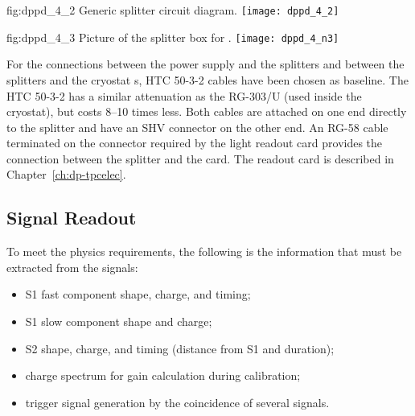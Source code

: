 \begin{dunefigure}{fig:dppd_4_2}
{Generic splitter circuit diagram.}
\texttt{[image: dppd\_4\_2]}
\end{dunefigure}

\begin{dunefigure}{fig:dppd_4_3}
{Picture of the splitter box for .}
\texttt{[image: dppd\_4\_n3]}
\end{dunefigure}

For the connections between the  power supply and the splitters and between the splitters and the cryostat \fdth{}s, HTC 50-3-2 cables have been chosen as baseline. The HTC 50-3-2 has a similar attenuation as the RG-303/U (used inside the cryostat), but costs \numrange{8}{10} times less. Both cables are attached on one end directly to the  splitter and have an SHV connector on the other end. An RG-58 cable terminated on the connector required by the light readout card provides the connection between the splitter and the card. The  readout card is described in Chapter~\ref{ch:dp-tpcelec}.


\subsection{Signal Readout}
\label{sec:fddp-pd-4.3}

To meet the physics requirements, the following is the information that must be extracted from the  signals:

\begin{itemize}
\item S1 fast component shape, charge, and timing;
\item S1 slow component shape and charge;
\item S2 shape, charge, and timing (distance from S1 and duration);
\item {} charge spectrum for gain calculation during  calibration;
\item trigger signal generation by the coincidence of several  signals.
\end{itemize}

